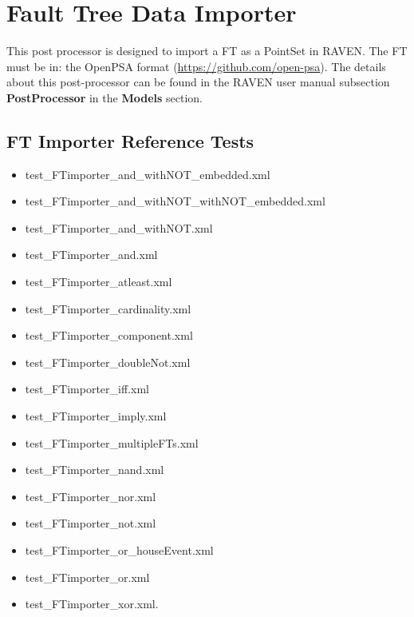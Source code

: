 \section{Fault Tree Data Importer}
\label{sec:FTdataImporter}

This post processor is designed to import a FT as a PointSet in RAVEN.
The FT must be in: the OpenPSA format (\href{<url>}{https://github.com/open-psa}).
The details about this post-processor can be found in the RAVEN user manual subsection \textbf{PostProcessor}
in the \textbf{Models} section.

\subsection{FT Importer Reference Tests}
\begin{itemize}
	\item test\_FTimporter\_and\_withNOT\_embedded.xml
	\item test\_FTimporter\_and\_withNOT\_withNOT\_embedded.xml
	\item test\_FTimporter\_and\_withNOT.xml
	\item test\_FTimporter\_and.xml
	\item test\_FTimporter\_atleast.xml
	\item test\_FTimporter\_cardinality.xml
	\item test\_FTimporter\_component.xml
	\item test\_FTimporter\_doubleNot.xml
	\item test\_FTimporter\_iff.xml
	\item test\_FTimporter\_imply.xml
	\item test\_FTimporter\_multipleFTs.xml
	\item test\_FTimporter\_nand.xml
	\item test\_FTimporter\_nor.xml
	\item test\_FTimporter\_not.xml
	\item test\_FTimporter\_or\_houseEvent.xml
	\item test\_FTimporter\_or.xml
	\item test\_FTimporter\_xor.xml.
\end{itemize}
